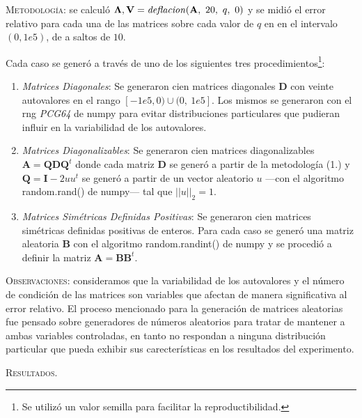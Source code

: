 \vspace{2em}
\noindent \textsc{Metodología}: se calculó  $\mathbf{\Lambda}, \mathbf{V} = \text{\textit{deflacion}}(\mathbf{A},\ 20,\ q,\ 0)$ y se midió el error relativo para cada una de las matrices sobre cada valor de $q$ en en el intervalo $(0, 1e5)$, de a saltos de $10$.

\vspace{1em}
\noindent Cada caso se generó a través de uno de los siguientes tres procedimientos\footnote{Se utilizó un valor semilla para facilitar la reproductibilidad.}:

\vspace{1em}
\begin{enumerate}
    \item \textit{Matrices Diagonales}: Se generaron cien matrices diagonales \textbf{D} con veinte autovalores en el rango $[-1e5, 0) \cup (0,\ 1e5]$. Los mismos se generaron con el rng \textit{PCG64} de numpy para evitar distribuciones particulares que pudieran influir en la variabilidad de los autovalores.
    \\
    \item \textit{Matrices Diagonalizables}: Se generaron cien matrices diagonalizables $\mathbf{A} = \mathbf{Q}\mathbf{D}\mathbf{Q}^t$ donde cada matriz $\mathbf{D}$ se generó a partir de la metodología (1.) y $\mathbf{Q} = \mathbf{I} - 2uu^t$ se generó a partir de un vector aleatorio $u$ ---con el algoritmo random.rand() de numpy--- tal que $||u||_2 = 1$.
    \\
    \item \textit{Matrices Simétricas Definidas Positivas}: Se generaron cien matrices simétricas definidas positivas de enteros. Para cada caso se generó una matriz aleatoria \textbf{B} con el algoritmo random.randint() de numpy y se procedió a definir la matriz $\mathbf{A} = \mathbf{B} \mathbf{B}^t$. 
\end{enumerate}

\vspace{2em}
\noindent \textsc{Observaciones}: consideramos que la variabilidad de los autovalores y el número de condición de las matrices son variables que afectan de manera significativa al error relativo. El proceso mencionado para la generación de matrices aleatorias fue pensado sobre generadores de números aleatorios para tratar de mantener a ambas variables controladas, en tanto no respondan a ninguna distribución particular que pueda exhibir sus carecterísticas en los resultados del experimento. 


\vspace{2em}
\noindent \textsc{Resultados}. 
